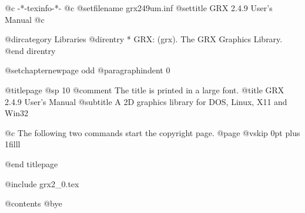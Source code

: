    @c -*-texinfo-*-
@c %
@setfilename grx249um.inf
@settitle GRX 2.4.9 User's Manual
@c %

@dircategory Libraries
@direntry
* GRX: (grx).                   The GRX Graphics Library.
@end direntry

@setchapternewpage odd
@paragraphindent 0

@titlepage
@sp 10
@comment The title is printed in a large font.
@title GRX 2.4.9 User's Manual
@subtitle A 2D graphics library for DOS, Linux, X11 and Win32

@c The following two commands start the copyright page.
@page
@vskip 0pt plus 1filll

@end titlepage

@include grx2_0.tex

@contents
@bye

